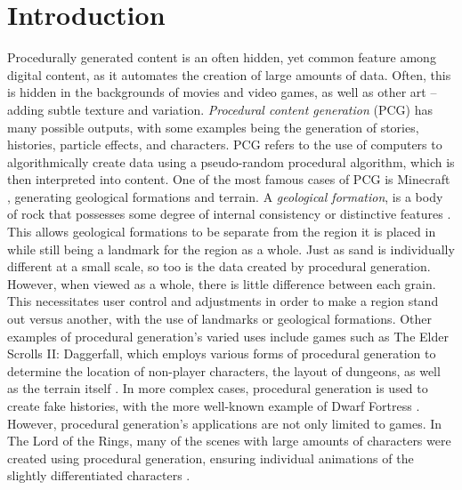 \documentclass[10pt]{report}
\begin{document}
	\clearpage
	
	\tableofcontents
	
	\clearpage
	
	\let\clearpage\relax
	\chapter{Introduction}
		
		Procedurally generated content is an often hidden, yet common feature among digital content, as it automates the creation of large amounts of data. Often, this is hidden in the backgrounds of movies and video games, as well as other art -- adding subtle texture and variation. \emph{Procedural content generation} (PCG) has many possible outputs, with some examples being the generation of stories, histories, particle effects, and characters. PCG refers to the use of computers to algorithmically create data using a pseudo-random procedural algorithm, which is then interpreted into content. One of the most famous cases of PCG is Minecraft \cite{minecraft-gen}, generating geological formations and terrain. A \emph{geological formation}, is a body of rock that possesses some degree of internal consistency or distinctive features \cite{2005}. This allows geological formations to be separate from the region it is placed in while still being a landmark for the region as a whole. Just as sand is individually different at a small scale, so too is the data created by procedural generation. However, when viewed as a whole, there is little difference between each grain. This necessitates user control and adjustments in order to make a region stand out versus another, with the use of landmarks or geological formations. Other examples of procedural generation's varied uses include games such as The Elder Scrolls II: Daggerfall, which employs various forms of procedural generation to determine the location of non-player characters, the layout of dungeons, as well as the terrain itself \cite{daggerfall}. In more complex cases, procedural generation is used to create fake histories, with the more well-known example of Dwarf Fortress \cite{df-dev}. However, procedural generation's applications are not only limited to games. In The Lord of the Rings, many of the scenes with large amounts of characters were created using procedural generation, ensuring individual animations of the slightly differentiated characters \cite{massive}.
		
\end{document}
